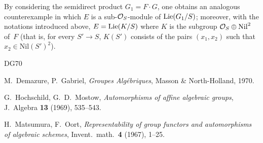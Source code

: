By considering the semidirect product \(G_1=F\cdot G\), one obtains an
analogous counterexample in which \(E\) is a sub-\(\mathcal{O}_S\)-module of
\(\operatorname{Lie}(G_1/S)\); moreover, with the notations introduced above,
\(E=\operatorname{Lie}(K/S)\) where \(K\) is the subgroup
\(\mathcal{O}_S\oplus\mathrm{Nil}^{2}\) of~\(F\) (that is, for every \(S'\to S\),
\(K(S')\) consists of the pairs \((x_1,x_2)\) such that
\(x_2\in\mathrm{Nil}(S')^{2}\)).

\makeatletter
\renewcommand{\@bibtitlestyle}{%
  \par\addvspace{1.1\baselineskip}%
  \noindent{\large\bfseries Bibliography}%
  {\renewcommand{\thefootnote}{(105)}\nde{Additional references cited in
  this Exposé.}}%
  \par\addvspace{0.45\baselineskip}%
}
\makeatother
\begin{thebibliography}{DG70}

M.~Demazure, P.~Gabriel, \emph{Groupes Algébriques}, Masson \&
North-Holland, 1970.

G.~Hochschild, G.~D.~Mostow, \emph{Automorphisms of affine algebraic
groups}, J.~Algebra \textbf{13} (1969), 535--543.

H.~Matsumura, F.~Oort, \emph{Representability of group functors and
automorphisms of algebraic schemes}, Invent.\ math.\ \textbf{4} (1967),
1--25.

\end{thebibliography}
